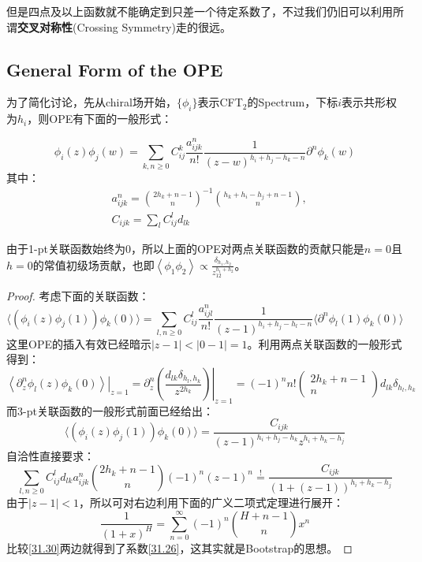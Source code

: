 但是四点及以上函数就不能确定到只差一个待定系数了，不过我们仍旧可以利用所谓\textbf{交叉对称性}(Crossing Symmetry)走的很远。

\subsection{General Form of the OPE}
为了简化讨论，先从chiral场开始，$\{\phi_i\}$表示CFT$_2$的Spectrum，下标$i$表示共形权为$h_i$，则OPE有下面的一般形式：
\begin{theorem}
	\begin{equation}
		\boxed{
		\phi_i(z)\phi_j(w)=\sum_{k,n\geq0}C_{ij}^k\frac{a_{ijk}^n}{n!}\frac{1}{(z-w)^{h_i+h_j-h_k-n}}\partial^n\phi_k(w)
		}
	\end{equation}
	其中：
	\begin{equation}\label{31.26}
		\begin{aligned}
			&a_{ijk}^{n} =\binom{2h_k+n-1}n^{-1}\binom{h_k+h_i-h_j+n-1}n,  \\
			&C_{ijk} =\sum_l{C_{ij}^{l}d_{lk}}
		\end{aligned}
	\end{equation}
\end{theorem}
由于1-pt关联函数始终为0，所以上面的OPE对两点关联函数的贡献只能是$n=0$且$h=0$的常值初级场贡献，也即$\left\langle\phi_1\phi_2\right\rangle\propto\frac{\delta_{h_1,h_2}}{z_{12}^{h_1+h_2}}$。
\begin{proof}
	考虑下面的关联函数：
	\begin{equation}
		\Big\langle\left(\phi_i(z)\phi_j(1)\right)\phi_k(0)\Big\rangle=\sum_{l,n\geq0}C_{ij}^l\frac{a_{ijl}^n}{n!}\frac{1}{(z-1)^{h_i+h_j-h_l-n}}\Big\langle\partial^n\phi_l(1)\phi_k(0)\Big\rangle 
	\end{equation}
	这里OPE的插入有效已经暗示$|z-1|<|0-1|=1$。利用两点关联函数的一般形式得到：
	\begin{equation}
		\left.\left\langle\partial_{z}^{n}\phi_{l}(z)\phi_{k}(0)\right\rangle\right|_{z=1}=\partial_{z}^{n}\left.\left(\frac{d_{lk}\delta_{h_{l},h_{k}}}{z^{2h_{k}}}\right)\right|_{z=1}=(-1)^{n}n!\left(\begin{matrix}2h_{k}+n-1\\n\end{matrix}\right)d_{lk}\delta_{h_{l},h_{k}}
	\end{equation}
	而3-pt关联函数的一般形式前面已经给出：
	\begin{equation}
			\Big\langle\left(\phi_i(z)\phi_j(1)\right)\phi_k(0)\Big\rangle=\frac{C_{ijk}}{(z-1)^{h_i+h_j-h_k}z^{h_i+h_k-h_j}}
	\end{equation}
	自洽性直接要求：
	\begin{equation}\label{31.30}
		\sum\limits_{l,n\geq0}C_{ij}^ld_{lk}a_{ijk}^n\binom{2h_k+n-1}{n}(-1)^n(z-1)^n\overset{!}{=}\frac{C_{ijk}}{\left(1+(z-1)\right)^{h_i+h_k-h_j}}
	\end{equation}
	由于$|z-1|<1$，所以可对右边利用下面的广义二项式定理进行展开：
	\begin{equation}
		\frac1{(1+x)^H}=\sum_{n=0}^\infty(-1)^n\binom{H+n-1}nx^n
	\end{equation}
	比较\ref{31.30}两边就得到了系数\ref{31.26}，这其实就是Bootstrap的思想。
\end{proof}
